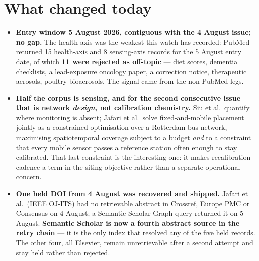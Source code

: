 \documentclass[10pt]{article}
\begin{document}
\section*{\sffamily\bfseries\color{Deep}What changed today}
\vspace{-1.5mm}{\color{Amber}\rule{\linewidth}{1.1pt}}\vspace{2.5mm}

\footnotesize
\enlargethispage{3\baselineskip}
\begin{itemize}\setlength{\itemsep}{1.1mm}
\item \textbf{Entry window 5 August 2026, contiguous with the 4 August issue; no gap.}
The health axis was the weakest this watch has recorded: PubMed returned 15 health-axis
and 8 sensing-axis records for the 5 August entry date, of which \textbf{11 were rejected
as off-topic} --- diet scores, dementia checklists, a lead-exposure oncology paper, a
correction notice, therapeutic aerosols, poultry bioaerosols. The signal came from the
non-PubMed legs.

\item \textbf{Half the corpus is sensing, and for the second consecutive issue that is
network \emph{design}, not calibration chemistry.} Siu et al.\ quantify where monitoring
is absent; Jafari et al.\ solve fixed-and-mobile placement jointly as a constrained
optimisation over a Rotterdam bus network, maximising spatiotemporal coverage subject to
a budget \emph{and} to a constraint that every mobile sensor passes a reference station
often enough to stay calibrated. That last constraint is the interesting one: it makes
recalibration cadence a term in the siting objective rather than a separate operational
concern.

\item \textbf{One held DOI from 4 August was recovered and shipped.} Jafari et al.\
(IEEE OJ-ITS) had no retrievable abstract in Crossref, Europe PMC or Consensus on 4
August; a Semantic Scholar Graph query returned it on 5 August. \textbf{Semantic Scholar
is now a fourth abstract source in the retry chain} --- it is the only index that resolved
any of the five held records. The other four, all Elsevier, remain unretrievable after a
second attempt and stay held rather than rejected.


\end{itemize}
\end{document}
